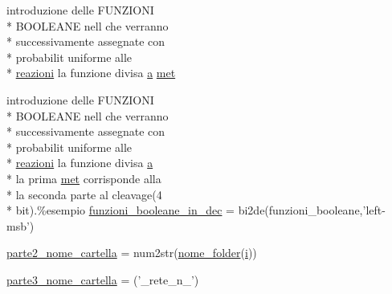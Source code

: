 \begin{DoxyCompactItemize}
$$\item 
introduzione delle F\-U\-N\-Z\-I\-O\-N\-I \\*
B\-O\-O\-L\-E\-A\-N\-E nell che verranno \\*
successivamente assegnate con \\*
probabilit uniforme alle \\*
\hyperlink{a00071_a69962f56e60d0c88abc5d4b6839c2886}{reazioni} la funzione divisa \hyperlink{a00035_a2ffdbad9ea59541e59cbd2b938e0770c}{a} \hyperlink{a00071_a53f2a5c181e46a513a4e87f144d19f6b}{met}
\item 
introduzione delle F\-U\-N\-Z\-I\-O\-N\-I \\*
B\-O\-O\-L\-E\-A\-N\-E nell che verranno \\*
successivamente assegnate con \\*
probabilit uniforme alle \\*
\hyperlink{a00071_a69962f56e60d0c88abc5d4b6839c2886}{reazioni} la funzione divisa \hyperlink{a00035_a2ffdbad9ea59541e59cbd2b938e0770c}{a} \\*
la prima \hyperlink{a00071_a53f2a5c181e46a513a4e87f144d19f6b}{met} corrisponde alla \\*
la seconda parte al cleavage(4 \\*
bit).\%esempio \hyperlink{a00071_af44cf9f59bd0c10b4d2aa541bd7c156b}{funzioni\-\_\-booleane\-\_\-in\-\_\-dec} = bi2de(funzioni\-\_\-booleane,'left-\/msb')
\item 
\hyperlink{a00071_a18f9e9dff2c5a2fe455a8d41fa6860fa}{parte2\-\_\-nome\-\_\-cartella} = num2str(\hyperlink{a00071_a277bc625a7a558f74ccc1eb2963d70d0}{nome\-\_\-folder}(\hyperlink{a00071_ad3efca1ea6e3333daf30719ee0501862}{i}))
\item 
\hyperlink{a00071_a1795e2dc228962c5b67eaee336bba2ad}{parte3\-\_\-nome\-\_\-cartella} = ('\-\_\-rete\-\_\-n\-\_\-')
\end{DoxyCompactItemize}


